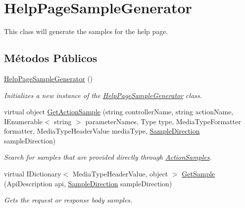 \hypertarget{classApi3Layers_1_1Areas_1_1HelpPage_1_1HelpPageSampleGenerator}{}\section{Help\+Page\+Sample\+Generator}
\label{classApi3Layers_1_1Areas_1_1HelpPage_1_1HelpPageSampleGenerator}


This class will generate the samples for the help page.  


\subsection*{Métodos Públicos}
\begin{DoxyCompactItemize}
\item 
\hyperlink{classApi3Layers_1_1Areas_1_1HelpPage_1_1HelpPageSampleGenerator_a60aa185fb74418b1ef0ce323e8a97d19}{Help\+Page\+Sample\+Generator} ()
\begin{DoxyCompactList}\small\item\em Initializes a new instance of the \hyperlink{classApi3Layers_1_1Areas_1_1HelpPage_1_1HelpPageSampleGenerator}{Help\+Page\+Sample\+Generator} class. \end{DoxyCompactList}\item 
virtual object \hyperlink{classApi3Layers_1_1Areas_1_1HelpPage_1_1HelpPageSampleGenerator_afc3c226b317421515e9e9b457b42f0f5}{Get\+Action\+Sample} (string controller\+Name, string action\+Name, I\+Enumerable$<$ string $>$ parameter\+Names, Type type, Media\+Type\+Formatter formatter, Media\+Type\+Header\+Value media\+Type, \hyperlink{namespaceApi3Layers_1_1Areas_1_1HelpPage_abad9f6d2b059d72558bf70415efc32b5}{Sample\+Direction} sample\+Direction)
\begin{DoxyCompactList}\small\item\em Search for samples that are provided directly through \hyperlink{classApi3Layers_1_1Areas_1_1HelpPage_1_1HelpPageSampleGenerator_aa710c187ca87cf2194303931e56088f5}{Action\+Samples}. \end{DoxyCompactList}\item 
virtual I\+Dictionary$<$ Media\+Type\+Header\+Value, object $>$ \hyperlink{classApi3Layers_1_1Areas_1_1HelpPage_1_1HelpPageSampleGenerator_a0fe20b65da31afc9d8067976c6388b80}{Get\+Sample} (Api\+Description api, \hyperlink{namespaceApi3Layers_1_1Areas_1_1HelpPage_abad9f6d2b059d72558bf70415efc32b5}{Sample\+Direction} sample\+Direction)
\begin{DoxyCompactList}\small\item\em Gets the request or response body samples. \end{DoxyCompactList}\item 

\end{DoxyCompactItemize}
